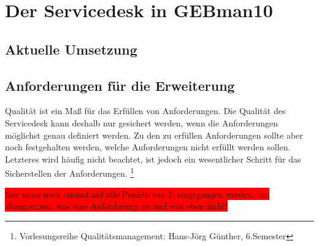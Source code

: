 
\section{Der Servicedesk in GEBman10}

\subsection{Aktuelle Umsetzung}

\subsection{Anforderungen für die Erweiterung}

\noindent
Qualität ist ein Maß für das Erfüllen von Anforderungen. Die Qualität des Servicedesk kann deshalb nur gesichert werden, wenn die Anforderungen möglichst genau definiert werden. Zu den zu erfüllen Anforderungen sollte aber noch festgehalten werden, welche Anforderungen nicht erfüllt werden sollen. Letzteres wird häufig nicht beachtet, ist jedoch ein wesentlicher Schritt für das Sicherstellen der Anforderungen. \footnote{Vorlesungsreihe Qualitätsmanagement: Hans-Jörg Günther, 6.Semester}

\colorbox{red}{hier muss noch einmal auf alle Punkte von 2. eingegangen werden, um abzugrenzen, was eine Anforderung ist und was eben nicht! }
